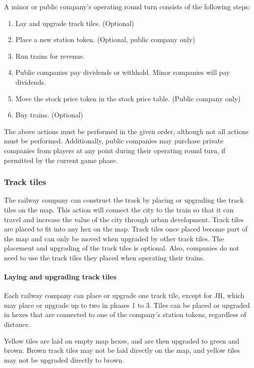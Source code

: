 \documentclass{article}
\begin{document}
\begin{CJK}{UTF8}{min}
\begin{multicols}{2}
A minor or public company's operating round turn consists of the following steps:

\begin{enumerate}
\item Lay and upgrade track tiles. (Optional)
\item Place a new station token. (Optional, public company only)
\item Run trains for revenue.
\item Public companies pay dividends or withhold. Minor companies will
  pay dividends.
\item Move the stock price token in the stock price table. (Public company only)
\item Buy trains. (Optional)
\end{enumerate}

The above actions must be performed in the given order, although not
all actions must be performed. Additionally, public companies may
purchase private companies from players at any point during their
operating round turn, if permitted by the current game phase.

\subsubsection{Track tiles}
The railway company can construct the track by placing or upgrading
the track tiles on the map. This action will connect the city to the
train so that it can travel and increase the value of the city through
urban development. Track tiles are placed to fit into any hex on the
map. Track tiles once placed become part of the map and can only be
moved when upgraded by other track tiles. The placement and upgrading
of the track tiles is optional. Also, companies do not need to use the
track tiles they placed when operating their trains.

\paragraph{Laying and upgrading track tiles}
Each railway company can place or upgrade one track tile, except for
JR, which may place or upgrade up to two in phases 1 to 3. Tiles can
be placed or upgraded in hexes that are connected to one of the
company's station tokens, regardless of distance.

Yellow tiles are laid on empty map hexes, and are then upgraded to
green and brown. Brown track tiles may not be laid directly on the
map, and yellow tiles may not be upgraded directly to brown.


\end{multicols}
\end{CJK}
\end{document}
